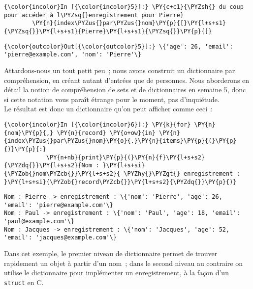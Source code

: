     \begin{Verbatim}[commandchars=\\\{\}]
{\color{incolor}In [{\color{incolor}5}]:} \PY{c+c1}{\PYZsh{} du coup pour accéder à l\PYZsq{}enregistrement pour Pierre}
        \PY{n}{index\PYZus{}par\PYZus{}nom}\PY{p}{[}\PY{l+s+s1}{\PYZsq{}}\PY{l+s+s1}{Pierre}\PY{l+s+s1}{\PYZsq{}}\PY{p}{]}
\end{Verbatim}


\begin{Verbatim}[commandchars=\\\{\}]
{\color{outcolor}Out[{\color{outcolor}5}]:} \{'age': 26, 'email': 'pierre@example.com', 'nom': 'Pierre'\}
\end{Verbatim}
            
    Attardons-nous un tout petit peu~; nous avons construit un dictionnaire
par compréhension, en créant autant d'entrées que de personnes. Nous
aborderons en détail la notion de compréhension de sets et de
dictionnaires en semaine 5, donc si cette notation vous paraît étrange
pour le moment, pas d'inquiétude.\\

Le résultat est donc un dictionnaire qu'on peut afficher comme ceci~:

    \begin{Verbatim}[commandchars=\\\{\}]
{\color{incolor}In [{\color{incolor}6}]:} \PY{k}{for} \PY{n}{nom}\PY{p}{,} \PY{n}{record} \PY{o+ow}{in} \PY{n}{index\PYZus{}par\PYZus{}nom}\PY{o}{.}\PY{n}{items}\PY{p}{(}\PY{p}{)}\PY{p}{:}
            \PY{n+nb}{print}\PY{p}{(}\PY{n}{f}\PY{l+s+s2}{\PYZdq{}}\PY{l+s+s2}{Nom : }\PY{l+s+si}{\PYZob{}nom\PYZcb{}}\PY{l+s+s2}{ \PYZhy{}\PYZgt{} enregistrement : }\PY{l+s+si}{\PYZob{}record\PYZcb{}}\PY{l+s+s2}{\PYZdq{}}\PY{p}{)}
\end{Verbatim}


    \begin{Verbatim}[commandchars=\\\{\}]
Nom : Pierre -> enregistrement : \{'nom': 'Pierre', 'age': 26, 'email': 'pierre@example.com'\}
Nom : Paul -> enregistrement : \{'nom': 'Paul', 'age': 18, 'email': 'paul@example.com'\}
Nom : Jacques -> enregistrement : \{'nom': 'Jacques', 'age': 52, 'email': 'jacques@example.com'\}

    \end{Verbatim}

    Dans cet exemple, le premier niveau de dictionnaire permet de trouver
rapidement un objet à partir d'un nom~; dans le second niveau au
contraire on utilise le dictionnaire pour implémenter un enregistrement,
à la façon d'un \texttt{struct} en C.

